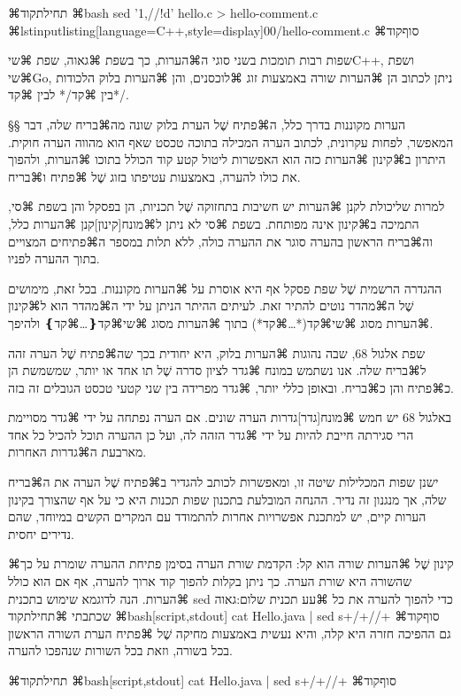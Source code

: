 ⌘תחילת{קוד}
⌘bash
sed '1,/\*\//!d' hello.c > hello-comment.c
\END
⌘lstinputlisting[language=C++,style=display]{00/hello-comment.c}
⌘סוף{קוד}

שפות רבות תומכות בשני סוגי ה⌘הערות, כך בשפת ⌘גאוה, שפת ⌘שי{C++}, ושפת
⌘שי{Go}, ניתן לכתוב הן ⌘הערות שורה באמצעות זוג ⌘לוכסנים, והן ⌘הערות בלוק
הלכודות בין ⌘קד{/*} לבין ⌘קד{*/}.

§§ הערות מקוננות
בדרך כלל, ה⌘פתיח שֶׁל הערת בלוק שונה מה⌘בריח שלה, דבר המאפשר, לפחות עקרונית,
לכתוב הערה המכילה בתוכה טכסט שאף הוא מהווה הערה חוקית. היתרון ב⌘קינון ⌘הערות
כזה הוא האפשרות ליטול קטע קוד הכולל בתוכו ⌘הערות, ולהפוך את כולו להערה,
באמצעות עטיפתו בזוג שֶׁל ⌘פתיח ו⌘בריח.

למרות שליכולת לקנן ⌘הערות יש חשיבות בתחזוקה שֶׁל תכניות, הן בפסקל והן בשפת ⌘סי,
התמיכה ב⌘קינון אינה מפותחת. בשפת ⌘סי לא ניתן ל⌘מונח[קינון]{קנן} ⌘הערות כלל,
וה⌘בריח הראשון בהערה סוגר את ההערה כולה, ללא תלות במספר ה⌘פתיחים המצויים בתוך
ההערה לפניו.

ההגדרה הרשמית שֶׁל שפת פסקל אף היא אוסרת על ⌘הערות מקוננות. בכל זאת, מימושים שֶׁל
ה⌘מהדר נוטים להתיר זאת. לעיתים ההיתר הניתן על ידי ה⌘מהדר הוא ל⌘קינון ⌘הערות
מסוג ⌘שי{\mbox{⌘קד{(*}…⌘קד{*)}}} בתוך ⌘הערות מסוג ⌘שי{\mbox{⌘קד{❴}…⌘קד{❵}}}
ולהיפך.

שפת אלגול 68, שבה נהוגות ⌘הערות בלוק, היא יחודית בכך שה⌘פתיח שֶׁל הערה זהה
ל⌘בריח שלה. אנו נשתמש במונח ⌘גדר לציון סדרה שֶׁל תו אחד או יותר, שמשמשת הן
כ⌘פתיח והן כ⌘בריח. ובאופן כללי יותר, ⌘גדר מפרידה בין שני קטעי טכסט הגובלים זה
בזה.

באלגול 68 יש חמש ⌘מונח[גדר]{גדרות} הערה שונים. אם הערה נפתחה על ידי ⌘גדר
מסויימת הרי סגירתה חייבת להיות על ידי ⌘גדר הזהה לה, ועל כן ההערה תוכל להכיל כל
אחד מארבעת ה⌘גדרות האחרות.

ישנן שפות המכלילות שיטה זו, ומאפשרות לכותב להגדיר ב⌘פתיח שֶׁל הערה את ה⌘בריח
שלה, אך מנגנון זה נדיר. ההנחה המובלעת בתכנון שפות תכנות היא כי על אף שהצורך
בקינון הערות קיים, יש למתכנת אפשרויות אחרות להתמודד עם המקרים הקשים במיוחד,
שהם נדירים יחסית.

⌘קינון שֶׁל ⌘הערות שורה הוא קל: הקדמת שורת הערה בסימן פתיחת ההערה שומרת על כך
שהשורה היא שורת הערה. כך ניתן בקלות להפוך קוד ארוך להערה, אף אם הוא כולל
⌘הערות. הנה לדוגמא שימוש בתכנית sed כדי להפוך להערה את כל ⌘עע תכנית שלום:גאוה
שכתבתי
⌘תחילת{קוד}
⌘bash[script,stdout]
cat Hello.java | sed s+/+//+
\END
⌘סוף{קוד}
גם ההפיכה חזרה היא קלה, והיא נעשית באמצעות מחיקה שֶׁל ⌘פתיח הערת השורה הראשון
בכל בשורה, וזאת בכל השורות שנהפכו להערה.

⌘תחילת{קוד}
⌘bash[script,stdout]
cat Hello.java | sed s+/+//+
\END
⌘סוף{קוד}

